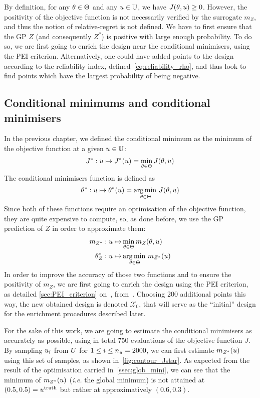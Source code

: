 \documentclass[../../Main_ManuscritThese.tex]{subfiles}
\begin{document}
By definition, for any $\theta\in \Theta$ and any $u \in \mathbb{U}$, we
have $J(\theta, u) \geq 0$.  However, the positivity of the objective
function is not necessarily verified by the surrogate $m_Z$, and thus
the notion of relative-regret is not defined. We have to first ensure
that the GP $Z$ (and consequently $Z^*$) is positive with large enough
probability.  To do so, we are first going to enrich the design near
the conditional minimisers, using the PEI criterion.  Alternatively,
one could have added points to the design according to the reliability
index, defined~\cref{eq:reliability_rho}, and thus look to find points
which have the largest probability of being negative.


\subsection{Conditional minimums and conditional minimisers}
\label{ssec:croco_cond_minimum_minimisers}

In the previous chapter, we defined the conditional minimum as the
minimum of the objective function at a given $u\in \mathbb{U}$:
\begin{equation}
  J^* : u \mapsto J^*(u) = \min_{\theta\in\Theta} J(\theta, u)
\end{equation}
The conditional minimisers function is defined as
\begin{equation}
  \theta^*:u  \mapsto \theta^*(u) = \operatorname*{arg\,min \,}_{\theta \in \Theta} J(\theta, u)
\end{equation}
Since both of these functions require an optimisation of the objective
function, they are quite expensive to compute, so, as done before, we
use the GP prediction of $Z$ in order to approximate them:
\begin{align}
  m_{Z^*}: u\mapsto &\min_{\theta \in \Theta} m_Z(\theta, u) \\
  \theta^*_{Z}: u  \mapsto &\operatorname*{arg\,min \,}_{\theta \in \Theta} m_{Z^*}(u)
\end{align}
In order to improve the accuracy of those two functions and to ensure
the positivity of $m_Z$, we are first going to enrich the design using
the PEI criterion, as detailed \cref{sec:PEI_criterion}
on~,
from~\cite{ginsbourger_bayesian_2014}.  Choosing \num{200} additional
points this way, the new obtained design is denoted $\mathcal{X}_0$,
that will serve as the ``initial'' design for the enrichment
procedures described later.

For the sake of this work, we are going to estimate the conditional
minimisers as accurately as possible, using in total \num{750}
evaluations of the objective function $J$. By sampling $u_i$ from
$U$ for $1\leq i \leq n_{u}=\num{2000}$, we can first estimate
$m_{Z^*}(u)$ using this set of samples, as shown
in~\cref{fig:contour_Jstar}. As expected from the result of the
optimisation carried in~\cref{ssec:glob_mini}, we can see that the
minimum of $m_{Z^*}(u)$ (\emph{i.e.} the global minimum) is not
attained at $(0.5, 0.5)=u^{\mathrm{truth}}$ but rather at
approximatively $(\num{0.6},\num{0.3})$.
\end{document}
